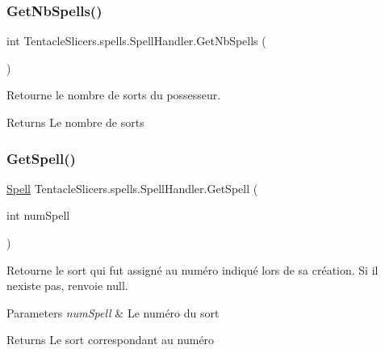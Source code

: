 \subsubsection{\texorpdfstring{Get\+Nb\+Spells()}{GetNbSpells()}}
{\footnotesize\ttfamily int Tentacle\+Slicers.\+spells.\+Spell\+Handler.\+Get\+Nb\+Spells (\begin{DoxyParamCaption}{ }\end{DoxyParamCaption})}



Retourne le nombre de sorts du possesseur. 

\begin{DoxyReturn}{Returns}
Le nombre de sorts 
\end{DoxyReturn}
\mbox{\label{class_tentacle_slicers_1_1spells_1_1_spell_handler_aa5c435cd7e2f44e3988c7aff1d0814b3}} 
\subsubsection{\texorpdfstring{Get\+Spell()}{GetSpell()}}
{\footnotesize\ttfamily \hyperlink{class_tentacle_slicers_1_1spells_1_1_spell}{Spell} Tentacle\+Slicers.\+spells.\+Spell\+Handler.\+Get\+Spell (\begin{DoxyParamCaption}\item[{int}]{num\+Spell }\end{DoxyParamCaption})}



Retourne le sort qui fut assigné au numéro indiqué lors de sa création. Si il n\textquotesingle{}existe pas, renvoie null. 


\begin{DoxyParams}{Parameters}
{\em num\+Spell} & Le numéro du sort \\
\hline
\end{DoxyParams}
\begin{DoxyReturn}{Returns}
Le sort correspondant au numéro 
\end{DoxyReturn}
\mbox{\label{class_tentacle_slicers_1_1spells_1_1_spell_handler_a47c8173e5ce918165b4b4b85ca20d44f}} 
